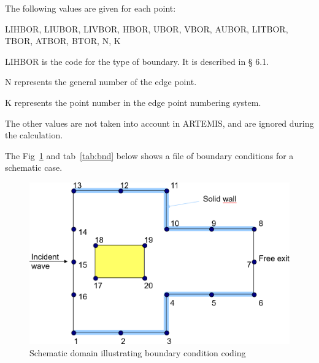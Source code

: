 The following values are given for each point:

LIHBOR, LIUBOR, LIVBOR, HBOR, UBOR, VBOR, AUBOR, LITBOR, TBOR, ATBOR, BTOR, N, K

LIHBOR is the code for the type of boundary. It is described in {\S} 6.1.

N represents the general number of the edge point.

K represents the point number in the edge point numbering system.

The other values are not taken into account in ARTEMIS, and are ignored during the calculation.

The Fig~\ref{fig:bnd} and tab~\ref{tab:bnd} below shows a file of boundary conditions for a schematic case.

\begin{figure}[H]%
\begin{center}
%
  \includegraphics[width=\textwidth]{./graphics/bnd}
%
\caption{Schematic domain illustrating boundary condition coding}\label{fig:bnd}
\end{center}
\end{figure}


